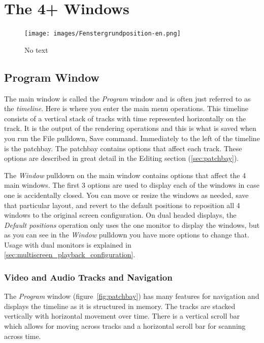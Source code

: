 \chapter{The 4+ Windows}%
\label{cha:the_4_windows}

\begin{figure}[htpb]
    \centering
    \texttt{[image: images/Fenstergrundposition-en.png]}
    \captionsetup{labelformat=empty, textformat=empty}
    \caption[The four windows (cc-by-sa Olaf)]{No text}    
    \label{fig:Fenstergrundposition-en}
\end{figure}

\section{Program Window}%
\label{sec:program_window}

The main window is called the \textit{Program} window and is often just referred to as the \textit{timeline}.  Here is where you enter the main menu operations.  
This timeline consists of a vertical stack of tracks with time represented horizontally on the track. 
It is the output of the rendering operations and this is what is saved when you run the File pulldown, Save command.
Immediately to the left of the timeline is the patchbay. The patchbay contains options that affect each track.  
These options are described in great detail in the Editing section (\ref{sec:patchbay}).

The \textit{Window} pulldown on the main window contains options that affect the 4 main windows. The first 3 options are used to display each of the windows in case one is accidentally closed.  You can
move or resize the windows as needed, save that particular layout, and revert to the default positions
to reposition all 4 windows to the original screen configuration.
On dual headed displays, the \textit{Default positions} operation only uses the one monitor to display the windows, but as you
can see in the \textit{Window} pulldown you have more options to change that. Usage with dual monitors is
explained in \ref{sec:multiscreen_playback_configuration}.

\subsection{Video and Audio Tracks and Navigation}%
\label{sub:video_and_audio_tracks_and_navigation}

The \textit{Program} window (figure~\ref{fig:patchbay}) has many features for navigation and displays the timeline as it is structured in memory. The tracks are stacked vertically with horizontal movement over time.
There is a vertical scroll bar which allows for moving across tracks and a horizontal scroll bar for scanning across time. 

